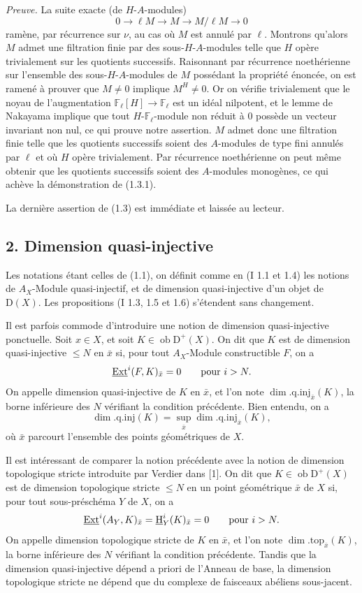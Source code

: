\documentclass[11pt]{article}
\providecommand{\uH}{\underline{\mathrm H}}
\DeclareMathOperator{\Ext}{Ext}
\newcommand{\D}{\mathrm{D}}
\newcommand{\F}{\mathbb{F}}
\newcommand{\ob}{\operatorname{ob}}
\providecommand{\ob}{\operatorname{ob}}
\begin{document}
\emph{Preuve.} La suite exacte (de $H$-$A$-modules)
\[
        0\longrightarrow \ell M\longrightarrow M\longrightarrow M/\ell M\longrightarrow 0
\]
ramène, par récurrence sur $\nu$, au cas où $M$ est annulé par $\ell$. Montrons qu'alors $M$ admet une filtration finie par des sous-$H$-$A$-modules telle que $H$ opère trivialement sur les quotients successifs. Raisonnant par récurrence noethérienne sur l'ensemble des sous-$H$-$A$-modules de $M$ possédant la propriété énoncée, on est ramené à prouver que $M\neq0$ implique $M^H\neq0$. Or on vérifie trivialement que le noyau de l'augmentation $\F_\ell[H]\to\F_\ell$ est un idéal nilpotent, et le lemme de Nakayama implique que tout $H$-$\F_\ell$-module non réduit à $0$ possède un vecteur invariant non nul, ce qui prouve notre assertion. $M$ admet donc une filtration finie telle que les quotients successifs soient des $A$-modules de type fini annulés par $\ell$ et où $H$ opère trivialement. Par récurrence noethérienne on peut même obtenir que les quotients successifs soient des $A$-modules monogènes, ce qui achève la démonstration de (1.3.1).

La dernière assertion de (1.3) est immédiate et laissée au lecteur.

\subsection*{2. Dimension quasi-injective}

Les notations étant celles de (1.1), on définit comme en (I 1.1 et 1.4) les notions de $A_X$-Module quasi-injectif, et de dimension quasi-injective d'un objet de $\D(X)$. Les propositions (I 1.3, 1.5 et 1.6) s'étendent sans changement.

Il est parfois commode d'introduire une notion de dimension quasi-injective ponctuelle. Soit $x\in X$, et soit $K\in\ob \D^+(X)$. On dit que $K$ est de dimension quasi-injective $\leq N$ en $\bar{x}$ si, pour tout $A_X$-Module constructible $F$, on a
\[
        \underline{\Ext}^{i}(F,K)_{\bar{x}}=0\qquad\hbox{pour }i>N.
\]
On appelle dimension quasi-injective de $K$ en $\bar{x}$, et l'on note $\dim.\mathrm{q.inj}_{\bar{x}}(K)$, la borne inférieure des $N$ vérifiant la condition précédente. Bien entendu, on a
\[
        \dim.\mathrm{q.inj}(K)=\sup_{\bar{x}}\dim.\mathrm{q.inj}_{\bar{x}}(K),
\]
où $\bar{x}$ parcourt l'ensemble des points géométriques de $X$.

Il est intéressant de comparer la notion précédente avec la notion de dimension topologique stricte introduite par Verdier dans [1]. On dit que $K\in\ob \D^+(X)$ est de dimension topologique stricte $\leq N$ en un point géométrique $\bar{x}$ de $X$ si, pour tout sous-préschéma $Y$ de $X$, on a
\[
        \underline{\Ext}^{i}(A_Y,K)_{\bar{x}}=\uH^i_Y(K)_{\bar{x}}=0\qquad\hbox{pour }i>N.
\]
On appelle dimension topologique stricte de $K$ en $\bar{x}$, et l'on note $\dim.\mathrm{top}_{\bar{x}}(K)$, la borne inférieure des $N$ vérifiant la condition précédente. Tandis que la dimension quasi-injective dépend a priori de l'Anneau de base, la dimension topologique stricte ne dépend que du complexe de faisceaux abéliens sous-jacent.
\end{document}
